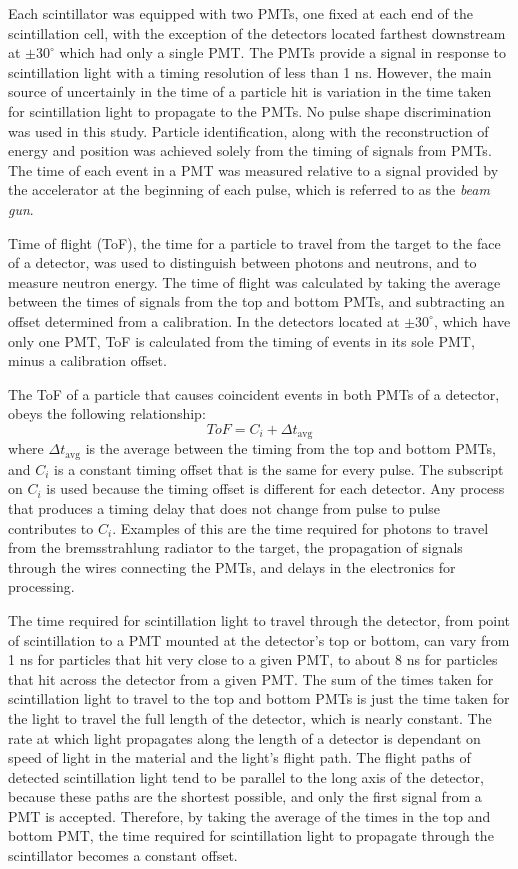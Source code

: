 Each scintillator was equipped with two PMTs, one fixed at each end of the scintillation cell, with the exception of the detectors located farthest downstream at $\pm30^{\circ}$ which had only a single PMT.
The PMTs provide a signal in response to scintillation light with a timing resolution of less than 1 ns.
However, the main source of uncertainly in the time of a particle hit is variation in the time taken for scintillation light to propagate to the PMTs. No pulse shape discrimination was used in this study.
Particle identification, along with the reconstruction of energy and position was achieved solely from the timing of signals from PMTs.
The time of each event in a PMT was measured relative to a signal provided by the accelerator at the beginning of each pulse, which is referred to as the \textit{beam gun}.

Time of flight (ToF), the time for a particle to travel from the target to the face of a detector, was used to distinguish between photons and neutrons, and to measure neutron energy.
The time of flight was calculated by taking the average between the times of signals from the top and bottom PMTs, and subtracting an offset determined from a calibration.
In the detectors located at $\pm30^{\circ}$, which have only one PMT, ToF is calculated from the timing of events in its sole PMT, minus a calibration offset.

The ToF of a particle that causes coincident events in both PMTs of a detector, obeys the following relationship:
\begin{displaymath}
ToF = C_i + \Delta t_{\text{avg}} 
\end{displaymath}
where $\Delta t_{\text{avg}} $ is the average between the timing from the top and bottom PMTs, and $C_i$ is a constant timing offset that is the same for every pulse.
The subscript on $C_i$ is used because the timing offset is different for each detector.
Any process that produces a timing delay that does not change from pulse to pulse contributes to $C_{i}$.
Examples of this are the time required for photons to travel from the bremsstrahlung radiator to the target, the propagation of signals through the wires connecting the PMTs, and delays in the electronics for processing.

The time required for scintillation light to travel through the detector, from point of scintillation to a PMT mounted at the detector's top or bottom, can vary from 1 ns for particles that hit very close to a given PMT, to about 8 ns for particles that hit across the detector from a given PMT. The sum of the times taken for scintillation light to travel to the top and bottom PMTs is just the time taken for the light to travel the full length of the detector, which is nearly constant.
The rate at which light propagates along the length of a detector is dependant on speed of light in the material and the light's flight path.
The flight paths of detected scintillation light tend to be parallel to the long axis of the detector, because these paths are the shortest possible, and only the first signal from a PMT is accepted.
Therefore, by taking the average of the times in the top and bottom PMT, the time required for scintillation light to propagate through the scintillator becomes a constant offset.

